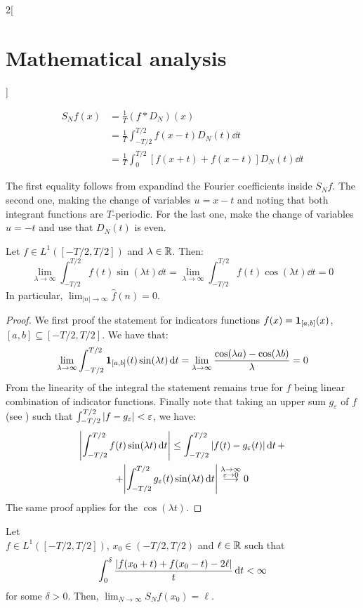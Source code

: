 \documentclass[../../../main_math.tex]{subfiles}
\begin{document}
\begin{multicols}{2}[\section{Mathematical analysis}]
\begin{proposition}
    \begin{align*}
      S_Nf(x) & =\frac{1}{T}(f*D_N)(x)                              \\
              & =\frac{1}{T}\int_{-T/2}^{T/2}f(x-t)D_N(t)\dd{t}     \\
              & =\frac{1}{T}\int_0^{T/2}[f(x+t)+f(x-t)]D_N(t)\dd{t}
    \end{align*}
  \end{proposition}
  \begin{sproof}
    The first equality follows from expandind the Fourier coefficients inside $S_Nf$. The second one, making the change of variables $u=x-t$ and noting that both integrant functions are $T$-periodic. For the last one, make the change of variables $u=-t$ and use that $D_N(t)$ is even.
  \end{sproof}
  \begin{lemma}\label{MA:riemannlebesgue}
    Let $f\in L^1([-T/2,T/2])$ and $\lambda\in\mathbb{R} $. Then: $$\lim_{\lambda\to\infty}\int_{-T/2}^{T/2}f(t)\sin(\lambda t)\dd{t}=\lim_{\lambda\to\infty}\int_{-T/2}^{T/2}f(t)\cos(\lambda t)\dd{t}=0$$ In particular, $\displaystyle\lim_{|n|\to\infty}\widehat{f}(n)=0$.
  \end{lemma}
  \begin{proof}
    We first proof the statement for indicators functions $f(x)=\boldsymbol{\mathrm{1}}_{[a,b]}(x)$, $[a,b]\subseteq [-T/2,T/2]$. We have that:
    $$\lim_{\lambda\to\infty}\int_{-T/2}^{T/2}\boldsymbol{\mathrm{1}}_{[a,b]}(t)\sin(\lambda t)\dd{t}=\lim_{\lambda\to\infty}\frac{\cos(\lambda a)-\cos(\lambda b)}{\lambda}=0$$
    From the linearity of the integral the statement remains true for $f$ being linear combination of indicator functions. Finally note that taking an upper sum $g_\varepsilon$ of $f$ (see ) such that $\int_{-T/2}^{T/2}\abs{f-g_\varepsilon}<\varepsilon$, we have:
    \begin{multline*}
      \abs{\int_{-T/2}^{T/2}f(t)\sin(\lambda t)\dd{t}}\leq\int_{-T/2}^{T/2}\abs{f(t)-g_\varepsilon(t)}\dd{t}+\\+\abs{\int_{-T/2}^{T/2}g_\varepsilon(t)\sin(\lambda t)\dd{t}}\overset{\substack{\lambda\to\infty\\\varepsilon\to 0}}{\longrightarrow}0
    \end{multline*}
    The same proof applies for the $\cos(\lambda t)$.
  \end{proof}
  \begin{theorem}\label{MA:dini}
    Let \\$f\in L^1([-T/2,T/2])$, $x_0\in (-T/2,T/2)$ and $\ell\in\mathbb{R} $ such that $$\int_0^\delta\frac{\abs{f(x_0+t)+f(x_0-t)-2\ell}}{t}\dd{t}<\infty$$ for some $\delta>0$. Then, $\displaystyle\lim_{N\to\infty}S_Nf(x_0)=\ell$.

\end{theorem}
\end{multicols}
\end{document}
